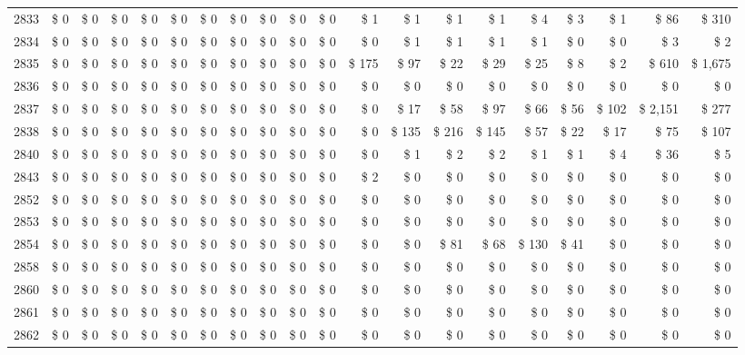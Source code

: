 \begin{longtable}{lrrrrrrrrrrrrrrrrrrr}
2833 & \$ 0 & \$ 0 & \$ 0 & \$ 0 & \$ 0 & \$ 0 & \$ 0 & \$ 0 & \$ 0 & \$ 0 & \$ 1 & \$ 1 & \$ 1 & \$ 1 & \$ 4 & \$ 3 & \$ 1 & \$ 86 & \$ 310 \\
2834 & \$ 0 & \$ 0 & \$ 0 & \$ 0 & \$ 0 & \$ 0 & \$ 0 & \$ 0 & \$ 0 & \$ 0 & \$ 0 & \$ 1 & \$ 1 & \$ 1 & \$ 1 & \$ 0 & \$ 0 & \$ 3 & \$ 2 \\
2835 & \$ 0 & \$ 0 & \$ 0 & \$ 0 & \$ 0 & \$ 0 & \$ 0 & \$ 0 & \$ 0 & \$ 0 & \$ 175 & \$ 97 & \$ 22 & \$ 29 & \$ 25 & \$ 8 & \$ 2 & \$ 610 & \$ 1,675 \\
2836 & \$ 0 & \$ 0 & \$ 0 & \$ 0 & \$ 0 & \$ 0 & \$ 0 & \$ 0 & \$ 0 & \$ 0 & \$ 0 & \$ 0 & \$ 0 & \$ 0 & \$ 0 & \$ 0 & \$ 0 & \$ 0 & \$ 0 \\
2837 & \$ 0 & \$ 0 & \$ 0 & \$ 0 & \$ 0 & \$ 0 & \$ 0 & \$ 0 & \$ 0 & \$ 0 & \$ 0 & \$ 17 & \$ 58 & \$ 97 & \$ 66 & \$ 56 & \$ 102 & \$ 2,151 & \$ 277 \\
2838 & \$ 0 & \$ 0 & \$ 0 & \$ 0 & \$ 0 & \$ 0 & \$ 0 & \$ 0 & \$ 0 & \$ 0 & \$ 0 & \$ 135 & \$ 216 & \$ 145 & \$ 57 & \$ 22 & \$ 17 & \$ 75 & \$ 107 \\
2840 & \$ 0 & \$ 0 & \$ 0 & \$ 0 & \$ 0 & \$ 0 & \$ 0 & \$ 0 & \$ 0 & \$ 0 & \$ 0 & \$ 1 & \$ 2 & \$ 2 & \$ 1 & \$ 1 & \$ 4 & \$ 36 & \$ 5 \\
2843 & \$ 0 & \$ 0 & \$ 0 & \$ 0 & \$ 0 & \$ 0 & \$ 0 & \$ 0 & \$ 0 & \$ 0 & \$ 2 & \$ 0 & \$ 0 & \$ 0 & \$ 0 & \$ 0 & \$ 0 & \$ 0 & \$ 0 \\
2852 & \$ 0 & \$ 0 & \$ 0 & \$ 0 & \$ 0 & \$ 0 & \$ 0 & \$ 0 & \$ 0 & \$ 0 & \$ 0 & \$ 0 & \$ 0 & \$ 0 & \$ 0 & \$ 0 & \$ 0 & \$ 0 & \$ 0 \\
2853 & \$ 0 & \$ 0 & \$ 0 & \$ 0 & \$ 0 & \$ 0 & \$ 0 & \$ 0 & \$ 0 & \$ 0 & \$ 0 & \$ 0 & \$ 0 & \$ 0 & \$ 0 & \$ 0 & \$ 0 & \$ 0 & \$ 0 \\
2854 & \$ 0 & \$ 0 & \$ 0 & \$ 0 & \$ 0 & \$ 0 & \$ 0 & \$ 0 & \$ 0 & \$ 0 & \$ 0 & \$ 0 & \$ 81 & \$ 68 & \$ 130 & \$ 41 & \$ 0 & \$ 0 & \$ 0 \\
2858 & \$ 0 & \$ 0 & \$ 0 & \$ 0 & \$ 0 & \$ 0 & \$ 0 & \$ 0 & \$ 0 & \$ 0 & \$ 0 & \$ 0 & \$ 0 & \$ 0 & \$ 0 & \$ 0 & \$ 0 & \$ 0 & \$ 0 \\
2860 & \$ 0 & \$ 0 & \$ 0 & \$ 0 & \$ 0 & \$ 0 & \$ 0 & \$ 0 & \$ 0 & \$ 0 & \$ 0 & \$ 0 & \$ 0 & \$ 0 & \$ 0 & \$ 0 & \$ 0 & \$ 0 & \$ 0 \\
2861 & \$ 0 & \$ 0 & \$ 0 & \$ 0 & \$ 0 & \$ 0 & \$ 0 & \$ 0 & \$ 0 & \$ 0 & \$ 0 & \$ 0 & \$ 0 & \$ 0 & \$ 0 & \$ 0 & \$ 0 & \$ 0 & \$ 0 \\
2862 & \$ 0 & \$ 0 & \$ 0 & \$ 0 & \$ 0 & \$ 0 & \$ 0 & \$ 0 & \$ 0 & \$ 0 & \$ 0 & \$ 0 & \$ 0 & \$ 0 & \$ 0 & \$ 0 & \$ 0 & \$ 0 & \$ 0 \\

\end{longtable}
